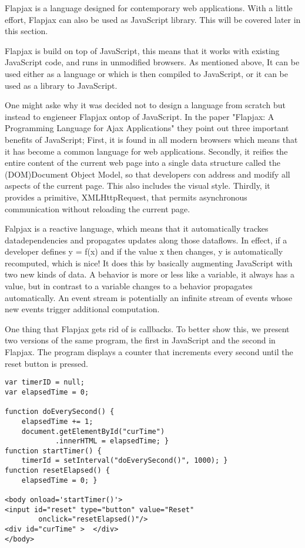 Flapjax is a language designed for contemporary web applications. With a little effort, Flapjax can also be used as JavaScript library. This will be covered later in this section.

Flapjax is build on top of JavaScript, this means that it works with existing JavaScript code, and runs in unmodified browsers. As mentioned above, It can be used either as a language or which is then compiled to JavaScript, or it can be used as a library to JavaScript.

One might aske why it was decided not to design a language from scratch but instead to engieneer Flapjax ontop of JavaScript. In the paper "Flapjax: A Programming Language for Ajax Applications" they point out three important benefits of JavaScript; First, it is found in all modern browsers which means that it has become a common language for web applications. Secondly, it reifies the entire content of the current web page into a single data structure called the (DOM)Document Object Model, so that developers con address and modify all aspects of the current page. This also includes the visual style. Thirdly, it provides a primitive, XMLHttpRequest, that permits asynchronous communication without reloading the current page.

Falpjax is a reactive language, which means that it automatically trackes datadependencies and propagates updates along those dataflows. In effect, if a developer defines y = f(x) and if the value x then changes, y is automatically recomputed, which is nice! 
It does this by basically augmenting JavaScript with two new kinds of data. A behavior is more or less like a variable, it always has a value, but in contrast to a variable changes to a behavior propagates automatically. An event stream is potentially an infinite stream of events whose new events trigger additional computation. 

One thing that Flapjax gets rid of is callbacks. To better show this, we present two versions of the same program, the first in JavaScript and the second in Flapjax.
The program displays a counter that increments every second until the reset button is pressed.

\begin{verbatim}
var timerID = null;
var elapsedTime = 0;

function doEverySecond() {
	elapsedTime += 1;
	document.getElementById("curTime")
			.innerHTML = elapsedTime; }
function startTimer() {
	timerId = setInterval("doEverySecond()", 1000); }
function resetElapsed() {
	elapsedTime = 0; }

<body onload='startTimer()'>
<input id="reset" type="button" value="Reset"
		onclick="resetElapsed()"/>
<div id="curTime" >  </div>
</body>
\end{verbatim}

